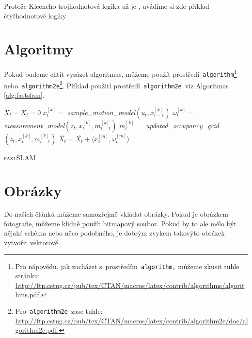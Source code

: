\documentclass[11pt]{article}
\begin{document}
\begin{table}[h]
    \caption{Protože Kleeneho trojhodnotová logika už je , uvádíme si zde příklad čtyřhodnotové logiky}
    \label{tab:kleene}
\end{table}

\pagebreak

\section{Algoritmy}
\label{sec:algoritmy}
Pokud budeme chtít vysázet algoritmus, můžeme použít prostředí\texttt{ algorithm}\footnote{Pro nápovědu, jak zacházet s~prostředím\texttt{ algorithm,} můžeme zkusit tuhle stránku:\\ \href{http://ftp.cstug.cz/pub/tex/CTAN/macros/latex/contrib/algorithms/algorithms.pdf}{http://ftp.cstug.cz/pub/tex/CTAN/macros/latex/contrib/algorithms/algorithms.pdf.}}\texttt{\ \,}nebo\texttt{ algorithm2e}\footnote{Pro\texttt{ algorithm2e }zase tuhle: \href{http://ftp.cstug.cz/pub/tex/CTAN/macros/latex/contrib/algorithm2e/doc/algorithm2e.pdf}{http://ftp.cstug.cz/pub/tex/CTAN/macros/latex/contrib/algorithm2e/doc/algorithm2e.pdf.}}.
Příklad použití prostředí\texttt{ algorithm2e }viz Algoritmus \ref{alg:fastslam}.
\smallskip
\begin{algorithm}
\SetNlSty{}{}{:}
\SetInd{1em}{1em}
\DontPrintSemicolon
{}
\BlankLine
\Indp\Indpp
\SetNlSkip{-1em}
$\overline{X_t} = X_t = 0$ \;
 {
    $x^{[k]}_t =$ \emph{sample\_motion\_model}$(u_t,x^{[k]}_{t-1})$ \;
    $\omega^{[k]}_t =$ \emph{measurement\_model}$(z_t,x^{[k]}_t, m^{[k]}_{t-1})$ \;
    $m^{[k]}_t =$ \emph{updated\_occupancy\_grid}$(z_t,x^{[k]}_t,m^{[k]}_{t-1})$ \;
    $\overline{X_t} = \overline{X_t} + \big \langle x^{[m]}_x,\omega^{[m]}_t \rangle$ \;
}

\caption{\textsc{fastSLAM}}
\label{alg:fastslam}
\end{algorithm}

\section{Obrázky}
Do našich článků můžeme samozřejmě vkládat obrázky. Pokud je obrázkem fotografie,
můžeme klidně použít bitmapový soubor. Pokud by to ale mělo být nějaké schéma nebo
něco podobného, je dobrým zvykem takovýto obrázek vytvořit vektorově.
\end{document}
